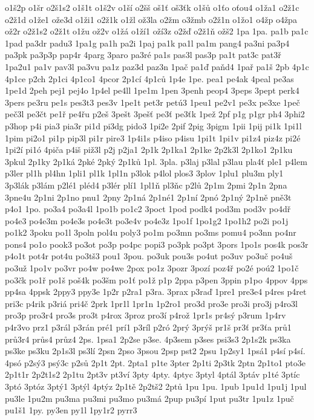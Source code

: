 o1š2p
o1šr
o2š1s2
o1š1t
o1š2v
o1ší
o2šš
oš1ť
oš3ťk
o1šů
o1ťo
oťou4
o1ža1
o2ž1c
o2ž1d
o1že1
ože3d
o1ži1
o2ž1k
o1žl
ož3la
o2žm
o3žmb
o2ž1n
o1žo1
o4žp
o4žpa
ož2r
o2ž1s2
o2ž1t
o1žu
ož2v
o1žá
o1ží1
oží3z
o2žď
o2ž1ň
ožš2
1pa
1pa.
pa1b
pa1c
1pad
pa3dr
padu3
1pa1g
pa1h
pa2i
1paj
pa1k
pa1l
pa1m
pang4
pa3ni
pa3p4
pa3pk
pa3p3p
pap4r
4parg
3paro
pa3ré
pa1s
pas3l
pas3p
pa1t
pat3c
pat3ř
1pa2u1
pa1v
pav3l
pa3vu
pa1z
paz3d
paz3n
1pač
pa1ď
paňd4
1pař
pa1š
2pb
4p1c
4p1ce
p2ch
2p1ci
4p1co1
4pcor
2p1cí
4p1ců
1p4e
1pe.
pea1
pe4ak
4peal
pe3as
1pe1d
2peh
pej1
pej4o
1p4el
pe4ll
1pe1m
1pen
3penh
peop4
3peps
3pept
perk4
3pers
pe3ru
pe1s
pes3t3
pes3v
1pe1t
pet3r
petú3
1peu1
pe2v1
pe3x
pe3xe
1peč
peč3l
pe3čt
pe1ř
pe4řu
p2eš
3pešt
3pešť
pe3ť
pe3ťk
1pež
2pf
p1g
p1gr
ph4
3phi2
p3hop
p4i
pia3
pia3r
pi1d
pi3dg
pido3
1pi2e
2pif
2pig
3pigm
1pii
1pij
pi1k
1pi1l
1pim
pi2o1
pi1p
pip3l
pi1r
pire3
1p4i1s
p4iso
p4isu
1pi1t
1pi1v
pi1z4
piz4z
pi2é
1pi2í
pi1ó
4piča
p4iš
piž3l
p2j
p2ja1
2p1k
2p1ka1
2p1ke
2p2k3l
2p1ko1
2p1ku
3pkul
2p1ky
2p1ká
2pké
2pký
2p1ků
1pl.
3pla.
p3laj
p3lal
p3lau
pla4ť
ple1
p4lem
p3ler
pl1h
pl4hn
1pli1
pl1k
1pl1n
p3lok
p4lol
plos3
3plov
1plu1
plu3m
ply1
3p3lák
p3lám
p2lé1
pléd4
p3lér
plí1
1pl1ň
pl3ňc
p2lů
2p1m
2pmi
2p1n
2pna
3pne4u
2p1ni
2p1no
pnu1
2pny
2p1ná
2p1né1
2p1ní
2pnó
2p1ný
2p1ně
pně3t
p4o1
1po.
po3a4
po3a4l
1po1b
po1c2
3poct
1pod
podk4
pod3m
pod3v
po4dř
po4e3
po4e3m
po4e3s
po4e3t
po3e4v
po4e3z
1po1f
1po1g2
1po1h2
po2i
po1j
po1k2
3poku
po1l
3poln
pol4u
poly3
po1m
po3mn
po3ms
pomu4
po3nn
po4nr
pons4
po1o
pook3
po3ot
po3p
po4pc
popi3
po3pk
po3pt
3pors
1po1s
pos4k
pos3r
p4o1t
pot4r
pot4u
po3tš3
pou1
3pou.
po3uk
pou3s
po4ut
po3uv
po3uč
po4uš
po3už
1po1v
po3vr
po4w
po4we
2pox
po1z
3pozr
3pozí
poz4ř
po2é
poú2
1po1č
po3čk
po1ř
po1š
poš4k
po3šm
po1ť
po1ž
p1p
2ppa
p3pen
3ppin
p1po
4ppov
4pps
pp4sa
4ppsk
2ppy3
ppy3e
1p2r
p2ra1
p3ra.
3prax
p3raď
1pre1
pre3e4
p4res
p4ret
pri3c
p4rik
p3riá
pri4č
2prk
1pr1l
1pr1n
1p2ro1
pro3d
pro3e
pro3i
pro3j
p4ro3l
pro3p
pro3r4
pro3s
pro3t
p4rox
3proz
pro3í
p4rož
1pr1s
pr4sý
p3rum
1p4rv
p4r3vo
prz1
p3rál
p3rán
pré1
prí1
p3ríl
p2ró
2prý
3prýš
pr1š
pr3ť
pr3ťa
prů1
prů3r4
průs4
průz4
2ps.
1psa1
2p2se
p3se.
4p3sem
p3ses
psi3s3
2p1s2k
ps3ka
ps3ke
ps3ku
2p1s3l
ps3lí
2psn
2pso
3psou
2psp
pst2
2psu
1p2sy1
1psá1
p4sí
p4sí.
4psó
p2sý3
psý3c
p2sů
2p1t
2pt.
2pta1
p1te
3pter
2p1ti
2p3tk
2ptn
2p1to1
pto3e
2p1t1r
2p2t1s2
2p1tu
2pt3v
pt3ví
3pty
4pty.
4ptyc
3ptyl
4ptál
3ptáv
p1té
3ptíc
3ptó
3ptóz
3ptý1
3ptýl
4ptýz
2p1tě
2p2tš2
2ptů
1pu
1pu.
1pub
1pu1d
1pu1j
1pul
pu3le
1pu2m
pu3ma
pu3mi
pu3mo
pu3má
2pup
pu3pí
1put
pu3tr
1pu1z
1puč
pu1š1
1py.
py3en
py1l
1py1r2
pyrr3
